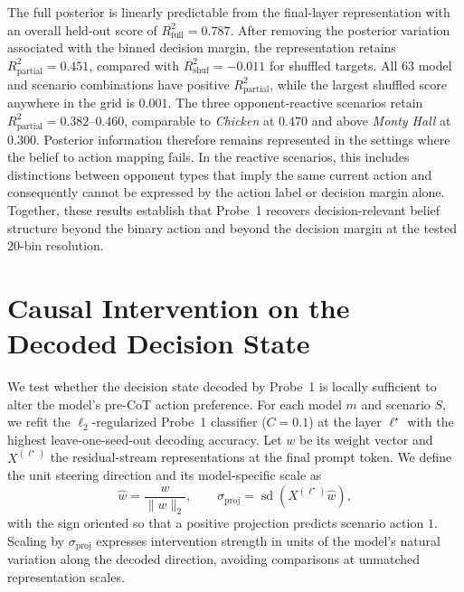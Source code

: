 \documentclass[letterpaper]{article} %
\begin{document}
The full posterior is linearly predictable from the final-layer representation with an overall held-out score of \(R^2_{\mathrm{full}}=0.787\). After removing the posterior variation associated with the binned decision margin, the representation retains \(R^2_{\mathrm{partial}}=0.451\), compared with \(R^2_{\mathrm{shuf}}=-0.011\) for shuffled targets. All \(63\) model and scenario combinations have positive \(R^2_{\mathrm{partial}}\), while the largest shuffled score anywhere in the grid is \(0.001\). The three opponent-reactive scenarios retain \(R^2_{\mathrm{partial}}=0.382\text{--}0.460\), comparable to \textit{Chicken} at \(0.470\) and above \textit{Monty Hall} at \(0.300\). Posterior information therefore remains represented in the settings where the belief to action mapping fails. In the reactive scenarios, this includes distinctions between opponent types that imply the same current action and consequently cannot be expressed by the action label or decision margin alone. Together, these results establish that Probe~1 recovers decision-relevant belief structure beyond the binary action and beyond the decision margin at the tested \(20\)-bin resolution.












\section{Causal Intervention on the Decoded Decision State}
\label{app:steering}

We test whether the decision state decoded by Probe~1 is locally sufficient to alter the model's pre-CoT action preference. For each model \(m\) and scenario \(S\), we refit the \(\ell_2\)-regularized Probe~1 classifier (\(C=0.1\)) at the layer \(\ell^\star\) with the highest leave-one-seed-out decoding accuracy. Let \(w\) be its weight vector and \(X^{(\ell^\star)}\) the residual-stream representations at the final prompt token. We define the unit steering direction and its model-specific scale as
\[
\widehat w=\frac{w}{\lVert w\rVert_2},
\qquad
\sigma_{\mathrm{proj}}
=
\operatorname{sd}\!\left(X^{(\ell^\star)}\widehat w\right),
\]
with the sign oriented so that a positive projection predicts scenario action \(1\). Scaling by \(\sigma_{\mathrm{proj}}\) expresses intervention strength in units of the model's natural variation along the decoded direction, avoiding comparisons at unmatched representation scales.
\end{document}
